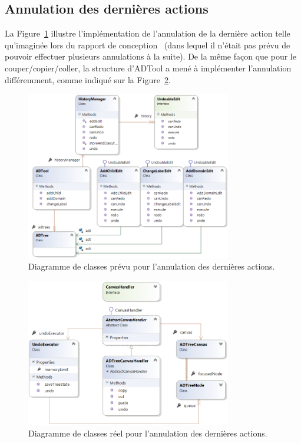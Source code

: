 	\subsection{Annulation des dernières actions}

		 La {\sc Figure}~\ref{fig:ctrlzPrevu} illustre l'implémentation de l'annulation de la dernière action telle qu'imaginée lors du rapport de conception~\cite{conception} (dans lequel il n'était pas prévu de pouvoir effectuer plusieurs annulations à la suite). De la même façon que pour le couper/copier/coller, la structure d'ADTool a mené à implémenter l'annulation différemment, comme indiqué sur la {\sc Figure}~\ref{fig:ctrlzReel}. 
		 
        \begin{figure}[H]
            \centering
                \includegraphics[width=0.8\textwidth]{figure/ctrlz.png}
            \caption{Diagramme de classes prévu pour l'annulation des dernières actions.}
            \label{fig:ctrlzPrevu}
        \end{figure}
        
        \begin{figure}[H]
            \centering
                \includegraphics[width=0.8\textwidth]{figure/ctrlzReel.png}
            \caption{Diagramme de classes réel pour l'annulation des dernières actions.}
            \label{fig:ctrlzReel}
        \end{figure}

